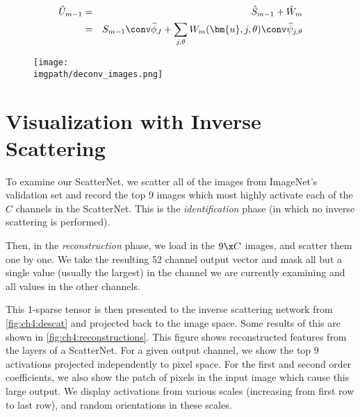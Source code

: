 \begin{eqnarray}
  \label{eq:ch4:x_hat}
  \hat{U}_{m-1} &=& \hat{S}_{m-1} + \hat{W}_{m} \\
              &=& S_{m-1} \conv \widetilde{\phi}_J + \sum_{j, \theta} W_{m}(\bm{u}, j,
  \theta) \conv \widetilde{\psi}_{j, \theta}
\end{eqnarray}

\begin{figure}[tp]
  \centering
  \texttt{[image: \\imgpath/deconv\_images.png]}
  \label{fig:ch4:reconstructions}
\end{figure}

\section{Visualization with Inverse Scattering}
\label{sec:ch4:visualization}

To examine our ScatterNet, we scatter all of the images from ImageNet's validation
set and record the top 9 images which most highly activate each of the $C$
channels in the ScatterNet. This is the \emph{identification} phase (in which no
inverse scattering is performed). 

Then, in the \emph{reconstruction}
phase, we load in the $9\x C$ images, and scatter them one by one. We take the
resulting 52 channel output vector and mask all but a single value (usually the
largest) in the channel we are currently examining and all values in the other
channels.

This 1-sparse tensor is then presented to the inverse scattering network from
\autoref{fig:ch4:descat} and projected back to the image space. Some results of this
are shown in \autoref{fig:ch4:reconstructions}. This figure shows reconstructed
features from the layers of a ScatterNet. For a given output channel, we show
the top 9 activations projected independently to pixel space. For the first and
second order coefficients, we also show the patch of pixels in the input image
which cause this large output. We display activations from various scales
(increasing from first row to last row), and random orientations in these
scales. 

